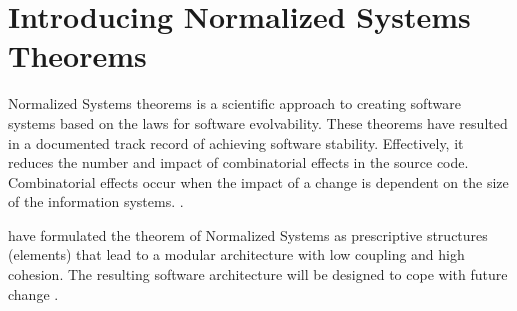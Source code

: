 \section{Introducing Normalized Systems Theorems}

Normalized Systems theorems is a scientific approach to creating software systems based on
the laws for software evolvability. These theorems have resulted in a documented track
record of achieving software stability. Effectively, it reduces the number and impact of
combinatorial effects in the source code. Combinatorial effects occur when the impact of a
change is dependent on the size of the information systems.
\parencite[]{mannaert_normalized_2009}. 

\citeauthor[]{mannaert_normalized_2009} have formulated the theorem of Normalized Systems
as prescriptive structures (elements) that lead to a modular architecture with low
coupling and high cohesion. The resulting software architecture will be designed to cope
with future change \parencites[]{mannaert_normalized_2009}.         